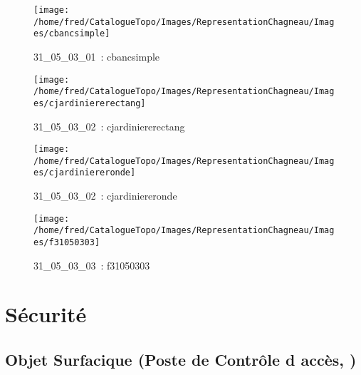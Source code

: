 \documentclass[12pt,titlepage]{book}
\begin{document}
\begin{figure}[h!]
\begin{minipage}[t]{3cm}
    \begin{center}
      \texttt{[image: /home/fred/CatalogueTopo/Images/RepresentationChagneau/Images/cbancsimple]}
      \caption[~31\_05\_03\_01]{\small{31\_05\_03\_01~:} \tiny{cbancsimple}}\label{cbancsimple}
    \end{center}
  \end{minipage}
  \begin{minipage}[t]{3cm}
    \begin{center}
      \texttt{[image: /home/fred/CatalogueTopo/Images/RepresentationChagneau/Images/cjardiniererectang]}
      \caption[~31\_05\_03\_02]{\small{31\_05\_03\_02~:} \tiny{cjardiniererectang}}\label{cjardiniererectang}
    \end{center}
  \end{minipage}
  \begin{minipage}[t]{3cm}
    \begin{center}
      \texttt{[image: /home/fred/CatalogueTopo/Images/RepresentationChagneau/Images/cjardiniereronde]}
      \caption[~31\_05\_03\_02]{\small{31\_05\_03\_02~:} \tiny{cjardiniereronde}}\label{cjardiniereronde}
    \end{center}
  \end{minipage}
  \begin{minipage}[t]{3cm}
    \begin{center}
      \texttt{[image: /home/fred/CatalogueTopo/Images/RepresentationChagneau/Images/f31050303]}
      \caption[~31\_05\_03\_03]{\small{31\_05\_03\_03~:} \tiny{f31050303}}\label{f31050303}
    \end{center}
  \end{minipage}
\end{figure}

\section{\large Sécurité}
\subsection{Objet Surfacique (Poste de Contrôle d accès,  )}
\noindent
\vspace{\baselineskip}
\end{document}
